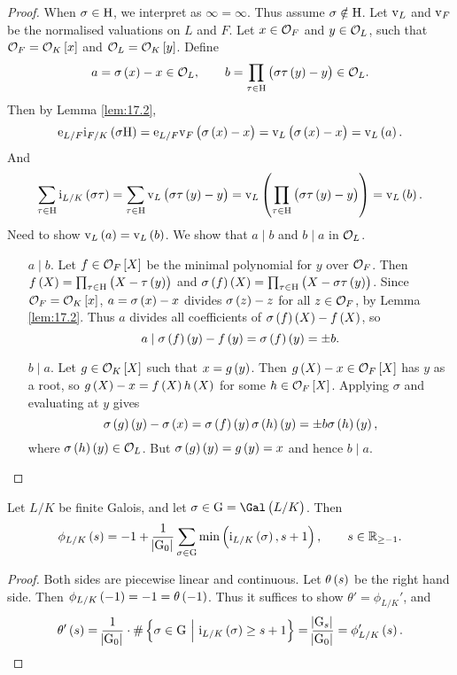\begin{proof}
When $ \sigma \in \mathrm{H} $, we interpret as $ \infty = \infty $. Thus assume $ \sigma \notin \mathrm{H} $. Let $ \mathrm{v}_L $ and $ \mathrm{v}_F $ be the normalised valuations on $ L $ and $ F $. Let $ x \in \mathcal{O}_F $ and $ y \in \mathcal{O}_L $, such that $ \OOO_F = \OOO_K\sbr{x} $ and $ \OOO_L = \OOO_K\sbr{y} $. Define
$$ a = \sigma\br{x} - x \in \OOO_L, \qquad b = \prod_{\tau \in \H} \br{\sigma\tau\br{y} - y} \in \OOO_L. $$
Then by Lemma \ref{lem:17.2},
$$ \e_{L / F}\i_{F / K}\br{\sigma\H} = \e_{L / F}\v_F\br{\sigma\br{x} - x} = \v_L\br{\sigma\br{x} - x} = \v_L\br{a}. $$
And
$$ \sum_{\tau \in \H} \i_{L / K}\br{\sigma\tau} = \sum_{\tau \in \H} \v_L\br{\sigma\tau\br{y} - y} = \v_L\br{\prod_{\tau \in \H} \br{\sigma\tau\br{y} - y}} = \v_L\br{b}. $$
Need to show $ \v_L\br{a} = \v_L\br{b} $. We show that $ a \mid b $ and $ b \mid a $ in $ \mathcal{O}_L $.
\begin{itemize}
\item[$ a \mid b $.] Let $ f \in \OOO_F\sbr{X} $ be the minimal polynomial for $ y $ over $ \mathcal{O}_F $. Then $ f\br{X} = \prod_{\tau \in \H} \br{X - \tau\br{y}} $ and $ \sigma\br{f}\br{X} = \prod_{\tau \in \H} \br{X - \sigma\tau\br{y}} $. Since $ \OOO_F = \OOO_K\sbr{x} $, $ a = \sigma\br{x} - x $ divides $ \sigma\br{z} - z $ for all $ z \in \mathcal{O}_F $, by Lemma \ref{lem:17.2}. Thus $ a $ divides all coefficients of $ \sigma\br{f}\br{X} - f\br{X} $, so
$$ a \mid \sigma\br{f}\br{y} - f\br{y} = \sigma\br{f}\br{y} = \pm b. $$
\item[$ b \mid a $.] Let $ g \in \OOO_K\sbr{X} $ such that $ x = g\br{y} $. Then $ g\br{X} - x \in \OOO_F\sbr{X} $ has $ y $ as a root, so $ g\br{X} - x = f\br{X}h\br{X} $ for some $ h \in \OOO_F\sbr{X} $. Applying $ \sigma $ and evaluating at $ y $ gives
$$ \sigma\br{g}\br{y} - \sigma\br{x} = \sigma\br{f}\br{y}\sigma\br{h}\br{y} = \pm b\sigma\br{h}\br{y}, $$
where $ \sigma\br{h}\br{y} \in \OOO_L $. But $ \sigma\br{g}\br{y} = g\br{y} = x $ and hence $ b \mid a $.
\end{itemize}
\end{proof}

\begin{lemma}
\label{lem:17.4}
Let $ L / K $ be finite Galois, and let $ \sigma \in \G = \Gal\br{L / K} $. Then
$$ \phi_{L / K}\br{s} = -1 + \dfrac{1}{\abs{\G_0}}\sum_{\sigma \in \G} \min\br{\i_{L / K}\br{\sigma}, s + 1}, \qquad s \in \RR_{\ge -1}. $$
\end{lemma}

\begin{proof}
Both sides are piecewise linear and continuous. Let $ \theta\br{s} $ be the right hand side. Then $ \phi_{L / K}\br{-1} = -1 = \theta\br{-1} $. Thus it suffices to show $ \theta' = \phi_{L / K}' $, and
$$ \theta'\br{s} = \dfrac{1}{\abs{\G_0}} \cdot \#\cbr{\sigma \in \G \st \i_{L / K}\br{\sigma} \ge s + 1} = \dfrac{\abs{\G_s}}{\abs{\G_0}} = \phi_{L / K}'\br{s}. $$
\end{proof}

